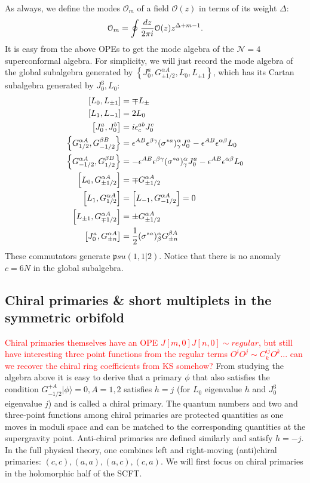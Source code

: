 \documentclass[11pt]{amsart}
\newcommand{\mf}{\mathfrak}
\newcommand{\mc}{\mathcal}
\theoremstyle{thm}
\numberwithin{equation}{subsection}
\theoremstyle{def}
\theoremstyle{rem}
\begin{document}
 As always, we define the modes $\mc O_m$ of a field $\mc O(z)$ in terms of its weight $\Delta$:
 \begin{equation}
 \mc O_m = \oint {dz \over 2\pi i} \mc O(z) z^{\Delta + m-1}.
 \end{equation}
 It is easy from the above OPEs to get the mode algebra of the $\mc N=4$ superconformal algebra. For simplicity, we will just record the mode algebra of the global subalgebra generated by $\left\lbrace J_0^a, G^{\alpha A}_{\pm 1/2}, L_0, L_{\pm 1} \right\rbrace$, which has its Cartan subalgebra generated by $J_0^3, L_0$: 
 \begin{align}
 \left[L_0, L_{\pm 1} \right]&= \mp L_{\pm}\\
 \left[L_1, L_{-1}\right] &= 2 L_0 \\
 \left[J^a_0, J^b_0 \right]&= i \epsilon^{a b}_c J^c_0 \\
 \left\lbrace  G^{\alpha A}_{1/2}, G^{\beta B}_{-1/2}\right\rbrace &= \epsilon^{AB}\epsilon^{\beta\gamma}(\sigma^{*a})^{\alpha}_{\gamma}J^a_0 -\epsilon^{AB}\epsilon^{\alpha \beta}L_0 \\
 \left\lbrace  G^{\alpha A}_{-1/2}, G^{\beta B}_{1/2}\right\rbrace &= -\epsilon^{AB}\epsilon^{\beta\gamma}(\sigma^{*a})^{\alpha}_{\gamma}J^a_0 -\epsilon^{AB}\epsilon^{\alpha \beta}L_0 \\
 \left[L_0, G^{\alpha A}_{\pm 1/2} \right]&= \mp G^{\alpha A}_{\pm 1/2}\\
 \left[L_1, G^{\alpha A}_{1/2}\right]&= \left[L_{-1}, G^{\alpha A}_{-1/2} \right] = 0 \\
 \left[L_{\pm1}, G^{\alpha A}_{\mp 1/2} \right]&= \pm G^{\alpha A}_{\pm 1/2} \\
 \left[J^a_{0}, G^{\alpha A}_{\pm n} \right]&= {1 \over 2}(\sigma^{*a})^{\alpha}_{\beta}G^{\beta A}_{\pm n} 
 \end{align} These commutators generate $\mf psu(1,1|2)$. Notice that there is no anomaly $c = 6 N$ in the global subalgebra. 
 
 
\subsection{Chiral primaries \& short multiplets in the symmetric orbifold}
\textcolor{red}{Chiral primaries themselves have an OPE $J[m, 0]J[n, 0] \sim regular$, but still have interesting three point functions from the regular terms $O^i O^j \sim C^{ij}_k O^k$... can we recover the chiral ring coefficients from KS somehow?}
From studying the algebra above it is easy to derive that a primary $\phi$ that also satisfies the condition $G^{+ A}_{-1/2}|\phi \rangle = 0, A=1,2$ satisfies $h=j$ (for $L_0$ eigenvalue $h$ and $J_0^3$ eigenvalue $j$) and is called a chiral primary. The quantum numbers and two and three-point functions among chiral primaries are protected quantities as one moves in moduli space and can be matched to the corresponding quantities at the supergravity point. Anti-chiral primaries are defined similarly and satisfy $h = -j$. In the full physical theory, one combines left and right-moving (anti)chiral primaries: $(c, c), (a,a), (a,c), (c, a)$. We will first focus on chiral primaries in the holomorphic half of the SCFT. 
\end{document}
